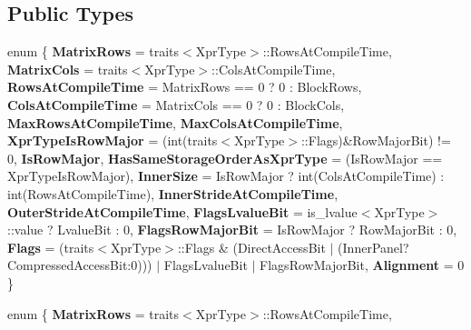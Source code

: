 \subsection*{Public Types}
\begin{DoxyCompactItemize}
\item 
\mbox{\label{struct_eigen_1_1internal_1_1traits_3_01_block_3_01_xpr_type_00_01_block_rows_00_01_block_cols_00_01_inner_panel_01_4_01_4_ac0724d0b59601eab7e9673e65c6050c1}} 
enum \{ \newline
{\bfseries Matrix\+Rows} = traits$<$Xpr\+Type$>$\+:\+:Rows\+At\+Compile\+Time, 
{\bfseries Matrix\+Cols} = traits$<$Xpr\+Type$>$\+:\+:Cols\+At\+Compile\+Time, 
{\bfseries Rows\+At\+Compile\+Time} = Matrix\+Rows == 0 ? 0 \+: Block\+Rows, 
{\bfseries Cols\+At\+Compile\+Time} = Matrix\+Cols == 0 ? 0 \+: Block\+Cols, 
\newline
{\bfseries Max\+Rows\+At\+Compile\+Time}, 
{\bfseries Max\+Cols\+At\+Compile\+Time}, 
{\bfseries Xpr\+Type\+Is\+Row\+Major} = (int(traits$<$Xpr\+Type$>$\+:\+:Flags)\&Row\+Major\+Bit) != 0, 
{\bfseries Is\+Row\+Major}, 
\newline
{\bfseries Has\+Same\+Storage\+Order\+As\+Xpr\+Type} = (Is\+Row\+Major == Xpr\+Type\+Is\+Row\+Major), 
{\bfseries Inner\+Size} = Is\+Row\+Major ? int(Cols\+At\+Compile\+Time) \+: int(Rows\+At\+Compile\+Time), 
{\bfseries Inner\+Stride\+At\+Compile\+Time}, 
{\bfseries Outer\+Stride\+At\+Compile\+Time}, 
\newline
{\bfseries Flags\+Lvalue\+Bit} = is\+\_\+lvalue$<$Xpr\+Type$>$\+:\+:value ? Lvalue\+Bit \+: 0, 
{\bfseries Flags\+Row\+Major\+Bit} = Is\+Row\+Major ? Row\+Major\+Bit \+: 0, 
{\bfseries Flags} = (traits$<$Xpr\+Type$>$\+:\+:Flags \& (Direct\+Access\+Bit $\vert$ (Inner\+Panel?Compressed\+Access\+Bit\+:0))) $\vert$ Flags\+Lvalue\+Bit $\vert$ Flags\+Row\+Major\+Bit, 
{\bfseries Alignment} = 0
 \}
\item 
\mbox{\label{struct_eigen_1_1internal_1_1traits_3_01_block_3_01_xpr_type_00_01_block_rows_00_01_block_cols_00_01_inner_panel_01_4_01_4_a3177bd950b69b66b1b9b812ae89d2d95}} 
enum \{ \newline
{\bfseries Matrix\+Rows} = traits$<$Xpr\+Type$>$\+:\+:Rows\+At\+Compile\+Time, 

\end{DoxyCompactItemize}
